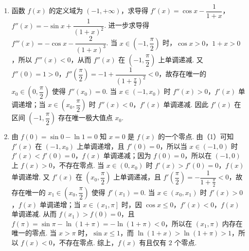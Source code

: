 \begin{solution}
\begin{enumerate}
\item 函数 \(f(x)\) 的定义域为 \((-1,+\infty)\)，求导得 \(f'(x)=\cos x-\dfrac{1}{1+x}\)，\(f''(x)=-\sin x+\dfrac{1}{(1+x)^2}\). 进一步求导得 \(f'''(x)=-\cos x-\dfrac{2}{(1+x)^3}\). 当 \(x\in\left(-1,\dfrac\pi2\right)\) 时，\(\cos x>0\)，\(1+x>0\)，所以 \(f'''(x)<0\)，从而 \(f''(x)\) 在 \(\left(-1,\dfrac\pi2\right)\) 上单调递减. 又 \(f''(0)=1>0\)，\(f''\left(\dfrac\pi2\right)=-1+\dfrac{1}{\left(1+\frac\pi2\right)^2}<0\)，故存在唯一的 \(x_0\in\left(0,\dfrac\pi2\right)\) 使得 \(f''(x_0)=0\). 当 \(x\in(-1,x_0)\) 时 \(f''(x)>0\)，\(f'(x)\) 单调递增；当 \(x\in\left(x_0,\dfrac\pi2\right)\) 时 \(f''(x)<0\)，\(f'(x)\) 单调递减. 因此 \(f'(x)\) 在区间 \(\left(-1,\dfrac\pi2\right)\) 存在唯一极大值点 \(x_0\).
\item 由 \(f(0)=\sin0-\ln1=0\) 知 \(x=0\) 是 \(f(x)\) 的一个零点. 由（1）可知 \(f'(x)\) 在 \((-1,x_0)\) 上单调递增，且 \(f'(0)=0\)，所以当 \(x\in(-1,0)\) 时 \(f'(x)<f'(0)=0\)，\(f(x)\) 单调递减；因为 \(f(0)=0\)，所以在 \((-1,0)\) 上 \(f(x)>0\)，不存在零点. 当 \(x\in(0,x_0)\) 时 \(f'(x)>f'(0)=0\)，\(f(x)\) 单调递增. 又 \(f'(x)\) 在 \(\left(x_0,\dfrac\pi2\right)\) 上单调递减，且 \(f'\left(\dfrac\pi2\right)=-\dfrac{1}{1+\frac\pi2}<0\)，故存在唯一的 \(x_1\in\left(x_0,\dfrac\pi2\right)\) 使得 \(f'(x_1)=0\). 当 \(x\in\left(x_0,x_1\right)\) 时 \(f'(x)>0\)，\(f(x)\) 单调递增；当 \(x\in\left(x_1,\pi\right]\) 时，因 \(\cos x\le0\)，\(f'(x)<0\)，\(f(x)\) 单调递减. 从而 \(f(x_1)>f(0)=0\)，且 \(f(\pi)=\sin\pi-\ln(1+\pi)=-\ln(1+\pi)<0\)，所以在 \((x_1,\pi)\) 内存在唯一的零点. 当 \(x>\pi\) 时，\(\sin x\le1\)，而 \(\ln(1+x)>\ln(1+\pi)>1\)，所以 \(f(x)<0\)，不存在零点. 综上，\(f(x)\) 有且仅有 \(2\) 个零点.
\end{enumerate}
\end{solution}

